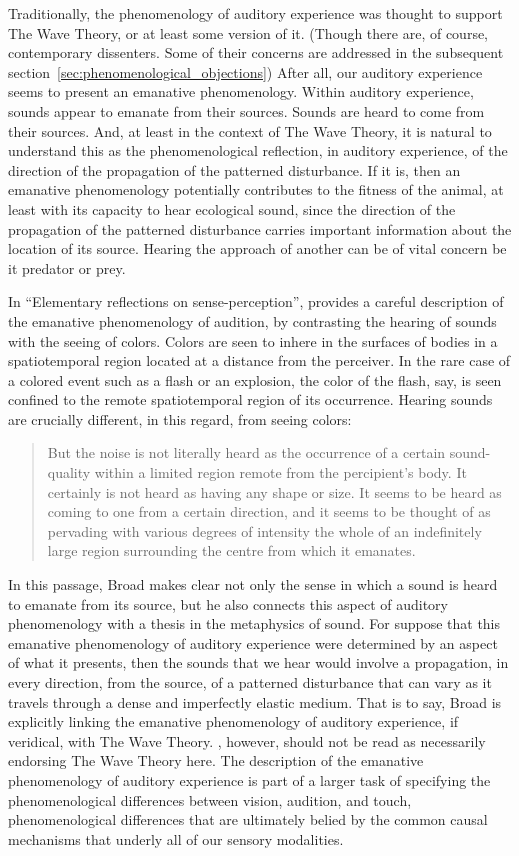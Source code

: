 Traditionally, the phenomenology of auditory experience was thought to support The Wave Theory, or at least some version of it. (Though there are, of course, contemporary dissenters. Some of their concerns are addressed in the subsequent section~\ref{sec:phenomenological_objections}) After all, our auditory experience seems to present an emanative phenomenology. Within auditory experience, sounds appear to emanate from their sources. Sounds are heard to come from their sources. And, at least in the context of The Wave Theory, it is natural to understand this as the phenomenological reflection, in auditory experience, of the direction of the propagation of the patterned disturbance. If it is, then an emanative phenomenology potentially contributes to the fitness of the animal, at least with its capacity to hear ecological sound, since the direction of the propagation of the patterned disturbance carries important information about the location of its source. Hearing the approach of another can be of vital concern be it predator or prey.

In ``Elementary reflections on sense-perception'', \citet{Broad:1952kx} provides a careful description of the emanative phenomenology of audition, by contrasting the hearing of sounds with the seeing of colors. Colors are seen to inhere in the surfaces of bodies in a spatiotemporal region located at a distance from the perceiver. In the rare case of a colored event such as a flash or an explosion, the color of the flash, say, is seen confined to the remote spatiotemporal region of its occurrence. Hearing sounds are crucially different, in this regard, from seeing colors:
\begin{quote}
	But the noise is not literally heard as the occurrence of a certain sound-quality within a limited region remote from the percipient's body. It certainly is not heard as having any shape or size. It seems to be heard as coming to one from a certain direction, and it seems to be thought of as pervading with various degrees of intensity the whole of an indefinitely large region surrounding the centre from which it emanates. \citep[5]{Broad:1952kx}
\end{quote}
In this passage, Broad makes clear not only the sense in which a sound is heard to emanate from its source, but he also connects this aspect of auditory phenomenology with a thesis in the metaphysics of sound. For suppose that this emanative phenomenology of auditory experience were determined by an aspect of what it presents, then the sounds that we hear would involve a propagation, in every direction, from the source, of a patterned disturbance that can vary as it travels through a dense and imperfectly elastic medium. That is to say, Broad is explicitly linking the emanative phenomenology of auditory experience, if veridical, with The Wave Theory. \citet{Broad:1952kx}, however, should not be read as necessarily endorsing The Wave Theory here. The description of the emanative phenomenology of auditory experience is part of a larger task of specifying the phenomenological differences between vision, audition, and touch, phenomenological differences that are ultimately belied by the common causal mechanisms that underly all of our sensory modalities.

